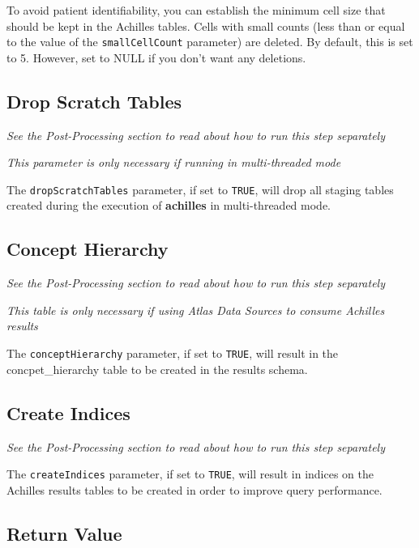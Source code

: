 \documentclass[]{article}
\begin{document}
To avoid patient identifiability, you can establish the minimum cell
size that should be kept in the Achilles tables. Cells with small counts
(less than or equal to the value of the \texttt{smallCellCount}
parameter) are deleted. By default, this is set to 5. However, set to
NULL if you don't want any deletions.

\subsection{Drop Scratch Tables}\label{drop-scratch-tables}

\emph{See the Post-Processing section to read about how to run this step
separately}

\emph{This parameter is only necessary if running in multi-threaded
mode}

The \texttt{dropScratchTables} parameter, if set to \texttt{TRUE}, will
drop all staging tables created during the execution of
\textbf{achilles} in multi-threaded mode.

\subsection{Concept Hierarchy}\label{concept-hierarchy}

\emph{See the Post-Processing section to read about how to run this step
separately}

\emph{This table is only necessary if using Atlas Data Sources to
consume Achilles results}

The \texttt{conceptHierarchy} parameter, if set to \texttt{TRUE}, will
result in the concpet\_hierarchy table to be created in the results
schema.

\subsection{Create Indices}\label{create-indices}

\emph{See the Post-Processing section to read about how to run this step
separately}

The \texttt{createIndices} parameter, if set to \texttt{TRUE}, will
result in indices on the Achilles results tables to be created in order
to improve query performance.

\subsection{Return Value}\label{return-value}
\end{document}
